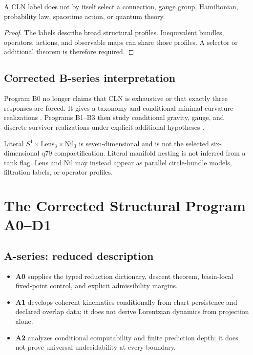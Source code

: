 \documentclass[11pt]{article}
\begin{document}
\begin{proposition}
A CLN label does not by itself select a connection, gauge group, Hamiltonian,
probability law, spacetime action, or quantum theory.
\end{proposition}

\begin{proof}
The labels describe broad structural profiles.  Inequivalent bundles,
operators, actions, and observable maps can share those profiles.  A selector
or additional theorem is therefore required.
\end{proof}

\subsection{Corrected B-series interpretation}

Program B0 no longer claims that CLN is exhaustive or that exactly three
responses are forced.  It gives a taxonomy and conditional minimal curvature
realizations \cite{Nero2026_MTT_B0_CircleLensNil}.  Programs B1--B3 then study
conditional gravity, gauge, and discrete-survivor realizations under explicit
additional hypotheses
\cite{Nero2026_MTT_B1_GravityEncoding,Nero2026_MTT_B2_GaugeEncoding,
Nero2026_MTT_B3_QuantizationEncoding}.

Literal $S^1\times\mathrm{Lens}_3\times\mathrm{Nil}_3$ is seven-dimensional
and is not the selected six-dimensional q79 compactification.  Literal
manifold nesting is not inferred from a rank flag.  Lens and Nil may instead
appear as parallel circle-bundle models, filtration labels, or operator
profiles.

\section{The Corrected Structural Program A0--D1}

\subsection{A-series: reduced description}

\begin{itemize}
\item \textbf{A0} supplies the typed reduction dictionary, descent theorem,
basin-local fixed-point control, and explicit admissibility margins.
\item \textbf{A1} develops coherent kinematics conditionally from chart
persistence and declared overlap data; it does not derive Lorentzian dynamics
from projection alone.
\item \textbf{A2} analyzes conditional computability and finite prediction
depth; it does not prove universal undecidability at every boundary.
\end{itemize}
\end{document}
